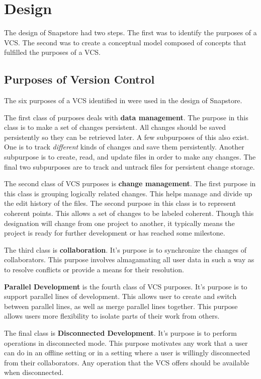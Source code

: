 \chapter{Design}

The design of Snapstore had two steps. The first was to identify the purposes of a VCS. The second was to create a conceptual model composed of concepts that fulfilled the purposes of a VCS.

\section{Purposes of Version Control}

The six purposes of a VCS identified in \cite{RossoJackson} were used in the design of Snapstore.

The first class of purposes deals with \textbf{data management}. The purpose in this class is to make a set of changes persistent. All changes should be saved persistently so they can be retrieved later. A few subpurposes of this also exist. One is to track \textit{different} kinds of changes and save them persistently. Another subpurpose is to create, read, and update files in order to make any changes. The final two subpurposes are to track and untrack files for persistent change storage.

The second class of VCS purposes is \textbf{change management}. The first purpose in this class is grouping logically related changes. This helps manage and divide up the edit history of the files. The second purpose in this class is to represent coherent points. This allows a set of changes to be labeled coherent. Though this designation will change from one project to another, it typically means the project is ready for further development or has reached some milestone. 

The third class is \textbf{collaboration}. It's purpose is to synchronize the changes of collaborators. This purpose involves almagamating all user data in such a way as to resolve conflicts or provide a means for their resolution.

\textbf{Parallel Development} is the fourth class of VCS purposes. It's purpose is to support parallel lines of development. This allows user to create and switch between parallel lines, as well as merge parallel lines together. This purpose allows users more flexibility to isolate parts of their work from others.

The final class is \textbf{Disconnected Development}. It's purpose is to perform operations in disconnected mode. This purpose motivates any work that a user can do in an offline setting or in a setting where a user is willingly disconnected from their collaborators. Any operation that the VCS offers should be available when disconnected.

